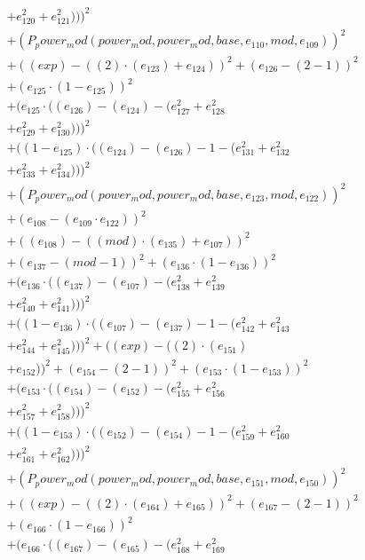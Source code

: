 \documentclass[10pt, a4paper]{article}
\begin{document}
\begin{small}
\begin{align*}
& + e_{120}^{2} + e_{121}^{2})))^{2} \\
& + (P_power_mod(power_mod, power_mod, base, e_{110}, mod, e_{109}))^{2} \\
& + ((exp) - ((2)  \cdot  (e_{123}) + e_{124}))^{2} + (e_{126} - (2 - 1))^{2} \\
& + (e_{125}  \cdot  (1 - e_{125}))^{2} \\
& + (e_{125}  \cdot  ((e_{126}) - (e_{124}) - (e_{127}^{2} + e_{128}^{2} \\
& + e_{129}^{2} + e_{130}^{2})))^{2} \\
& + ((1 - e_{125})  \cdot  ((e_{124}) - (e_{126}) - 1 - (e_{131}^{2} + e_{132}^{2} \\
& + e_{133}^{2} + e_{134}^{2})))^{2} \\
& + (P_power_mod(power_mod, power_mod, base, e_{123}, mod, e_{122}))^{2} \\
& + (e_{108} - (e_{109}  \cdot  e_{122}))^{2} \\
& + ((e_{108}) - ((mod)  \cdot  (e_{135}) + e_{107}))^{2} \\
& + (e_{137} - (mod - 1))^{2} + (e_{136}  \cdot  (1 - e_{136}))^{2} \\
& + (e_{136}  \cdot  ((e_{137}) - (e_{107}) - (e_{138}^{2} + e_{139}^{2} \\
& + e_{140}^{2} + e_{141}^{2})))^{2} \\
& + ((1 - e_{136})  \cdot  ((e_{107}) - (e_{137}) - 1 - (e_{142}^{2} + e_{143}^{2} \\
& + e_{144}^{2} + e_{145}^{2})))^{2} + ((exp) - ((2)  \cdot  (e_{151}) \\
& + e_{152}))^{2} + (e_{154} - (2 - 1))^{2} + (e_{153}  \cdot  (1 - e_{153}))^{2} \\
& + (e_{153}  \cdot  ((e_{154}) - (e_{152}) - (e_{155}^{2} + e_{156}^{2} \\
& + e_{157}^{2} + e_{158}^{2})))^{2} \\
& + ((1 - e_{153})  \cdot  ((e_{152}) - (e_{154}) - 1 - (e_{159}^{2} + e_{160}^{2} \\
& + e_{161}^{2} + e_{162}^{2})))^{2} \\
& + (P_power_mod(power_mod, power_mod, base, e_{151}, mod, e_{150}))^{2} \\
& + ((exp) - ((2)  \cdot  (e_{164}) + e_{165}))^{2} + (e_{167} - (2 - 1))^{2} \\
& + (e_{166}  \cdot  (1 - e_{166}))^{2} \\
& + (e_{166}  \cdot  ((e_{167}) - (e_{165}) - (e_{168}^{2} + e_{169}^{2} \\

\end{align*}
\end{small}
\end{document}
